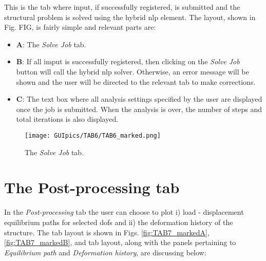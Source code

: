 This is the tab where input, if successfully registered, is submitted and the 
structural problem is solved using the hybrid \acrshort{nlp} element. The 
layout, shown in Fig. FIG, is fairly simple and relevant parts are:

\begin{itemize}
	\item \textbf{A}: The \textit{Solve Job} tab.
	\item \textbf{B}: If all imput is successfully registered, then clicking on 
	the \textit{Solve Job} button will call the hybrid \acrshort{nlp} solver. 
	Otherwise, an error message will be shown and the user will be directed to 
	the relevant tab to make corrections.
	\item \textbf{C}: The text box where all analysis settings specified by the 
	user are displayed once the job is submitted. When the analysis is over, 
	the number of steps and total iterations is also displayed.
\end{itemize}


\begin{figure}[t]
	\centering
	\texttt{[image: GUIpics/TAB6/TAB6\_marked.png]}
	\caption{The \textit{Solve Job} tab.}
	\label{fig:TAB6_marked}
\end{figure}

\clearpage

\section{The Post-processing tab}

In the \textit{Post-processing} tab the user can choose to plot i) load - 
displacement equilibrium paths for selected \acrshort{dof}s and ii) the 
deformation history of the structure. The tab layout is shown in Figs. 
\ref{fig:TAB7_markedA}, \ref{fig:TAB7_markedB}, and tab layout, along with the 
panels pertaining to \textit{Equilibrium path} and \textit{Deformation 
history}, are discussing below:

